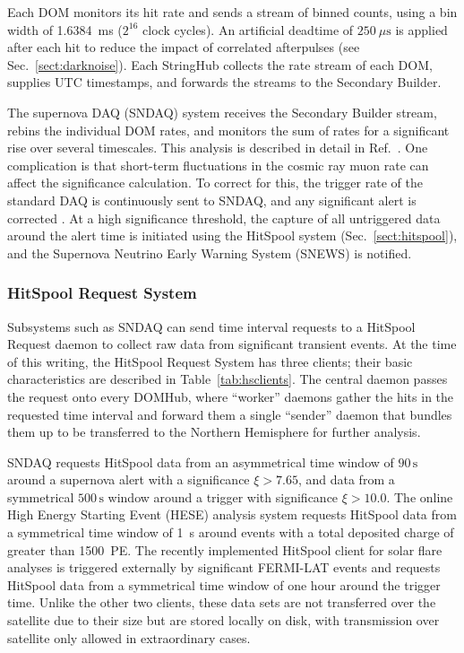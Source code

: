 Each DOM monitors its hit rate and sends a stream of binned counts, using a
bin width of 1.6384~ms ($2^{16}$ clock cycles).  An artificial
deadtime of $250\ {\mu}\mathrm{s}$ is applied after each hit to reduce the
impact of correlated afterpulses (see Sec.~\ref{sect:darknoise}).  Each
StringHub collects the rate stream of each DOM, supplies UTC timestamps,
and forwards the streams to the Secondary Builder.

The supernova DAQ (SNDAQ) system receives the Secondary Builder stream,
rebins the individual DOM rates, and monitors the sum of rates for a
significant rise over several timescales.  This analysis is described in
detail in Ref.~\cite{IC3:supernova}.  One complication is that short-term
fluctuations in the cosmic ray muon rate can affect the significance
calculation.  To correct for this, the trigger rate of the standard DAQ is
continuously sent to SNDAQ, and any significant alert is corrected
\cite{IC3:icrc15_sndaq}.  At a high significance threshold, the capture of
all untriggered data around the alert time is initiated using the HitSpool
system (Sec.~\ref{sect:hitspool}), and the Supernova Neutrino Early Warning
System (SNEWS) \cite{SNEWS} is notified.

\subsubsection{\label{sect:hitspool}HitSpool Request System}

Subsystems such as SNDAQ can send time interval requests to a HitSpool
Request daemon to collect raw data from significant transient events. At
the time of this writing, the HitSpool Request System has three clients;
their basic characteristics are described in
Table~\ref{tab:hsclients}.  The central daemon passes the request onto 
every DOMHub, where ``worker'' daemons gather the hits in the requested time
interval and forward them a single ``sender'' daemon
that bundles them up to be transferred to the Northern Hemisphere for further analysis.

SNDAQ requests HitSpool data from an asymmetrical time window of $90
\,\mathrm{s}$ around a supernova alert with a significance $\xi > 7.65$,
and data from a symmetrical $500\,\mathrm{s}$ window around a trigger with
significance $\xi > 10.0$.  The online High Energy Starting Event (HESE)
analysis system requests HitSpool data from a symmetrical time window of
1~s around events with a total deposited charge of greater than 1500~PE.
The recently implemented HitSpool client for solar flare analyses is
triggered externally by significant FERMI-LAT events and requests HitSpool
data from a symmetrical time window of one hour around the trigger
time. Unlike the other two clients, these data sets are not transferred
over the satellite due to their size but are stored locally on disk, with
transmission over satellite only allowed in extraordinary cases.

